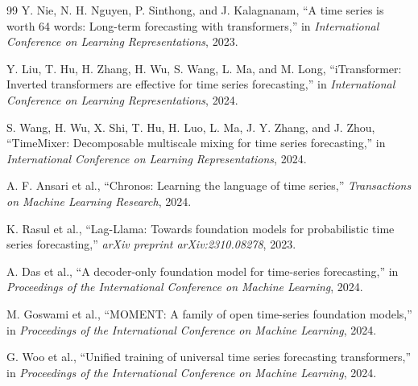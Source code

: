\documentclass[11pt]{article}
\begin{document}
\begin{thebibliography}{99}
Y. Nie, N. H. Nguyen, P. Sinthong, and J. Kalagnanam, ``A time series is worth 64 words: Long-term forecasting with transformers,'' in \emph{International Conference on Learning Representations}, 2023.

Y. Liu, T. Hu, H. Zhang, H. Wu, S. Wang, L. Ma, and M. Long, ``iTransformer: Inverted transformers are effective for time series forecasting,'' in \emph{International Conference on Learning Representations}, 2024.

S. Wang, H. Wu, X. Shi, T. Hu, H. Luo, L. Ma, J. Y. Zhang, and J. Zhou, ``TimeMixer: Decomposable multiscale mixing for time series forecasting,'' in \emph{International Conference on Learning Representations}, 2024.

A. F. Ansari et al., ``Chronos: Learning the language of time series,'' \emph{Transactions on Machine Learning Research}, 2024.

K. Rasul et al., ``Lag-Llama: Towards foundation models for probabilistic time series forecasting,'' \emph{arXiv preprint arXiv:2310.08278}, 2023.

A. Das et al., ``A decoder-only foundation model for time-series forecasting,'' in \emph{Proceedings of the International Conference on Machine Learning}, 2024.

M. Goswami et al., ``MOMENT: A family of open time-series foundation models,'' in \emph{Proceedings of the International Conference on Machine Learning}, 2024.

G. Woo et al., ``Unified training of universal time series forecasting transformers,'' in \emph{Proceedings of the International Conference on Machine Learning}, 2024.

\end{thebibliography}
\end{document}
